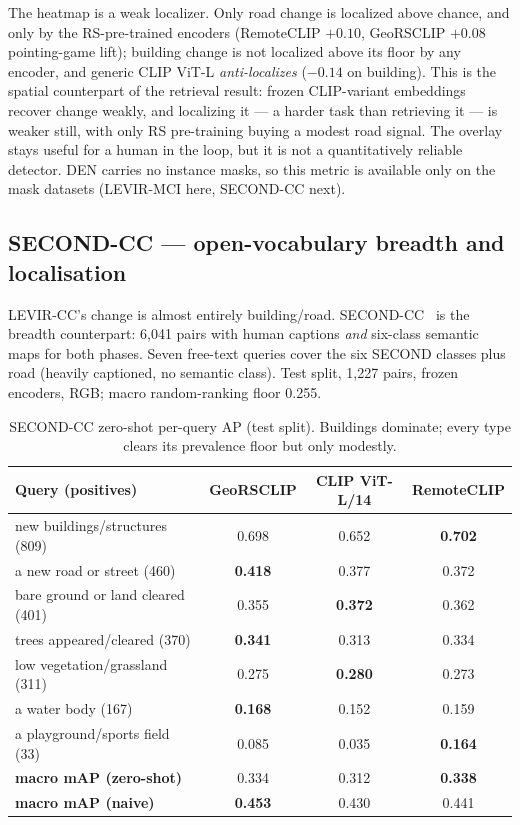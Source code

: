 \documentclass{article}
\begin{document}
The heatmap is a weak localizer. Only road change is localized above chance, and
only by the RS-pre-trained encoders (RemoteCLIP $+0.10$, GeoRSCLIP $+0.08$
pointing-game lift); building change is not localized above its floor by any
encoder, and generic CLIP ViT-L \emph{anti-localizes} ($-0.14$ on building). This
is the spatial counterpart of the retrieval result: frozen CLIP-variant embeddings
recover change weakly, and localizing it --- a harder task than retrieving it ---
is weaker still, with only RS pre-training buying a modest road signal. The overlay
stays useful for a human in the loop, but it is not a quantitatively reliable
detector. DEN carries no instance masks, so this metric is available only on the
mask datasets (LEVIR-MCI here, SECOND-CC next).

\subsection{SECOND-CC --- open-vocabulary breadth and localisation}
\label{sec:secondcc}

LEVIR-CC's change is almost entirely building/road. SECOND-CC~\cite{secondcc}
is the breadth counterpart: 6{,}041 pairs with
human captions \emph{and} six-class semantic maps for both phases. Seven free-text
queries cover the six SECOND classes plus road (heavily captioned, no semantic
class). Test split, 1{,}227 pairs, frozen encoders, RGB; macro random-ranking
floor 0.255.

\begin{table}[H]
    \centering
    \caption{SECOND-CC zero-shot per-query AP (test split). Buildings dominate;
    every type clears its prevalence floor but only modestly.}
    \label{tab:secondcc}
    \begin{tabular}{lccc}
        \toprule
        \textbf{Query (positives)} & \textbf{GeoRSCLIP} & \textbf{CLIP ViT-L/14} & \textbf{RemoteCLIP} \\
        \midrule
        new buildings/structures (809) & 0.698 & 0.652 & \textbf{0.702} \\
        a new road or street (460)     & \textbf{0.418} & 0.377 & 0.372 \\
        bare ground or land cleared (401) & 0.355 & \textbf{0.372} & 0.362 \\
        trees appeared/cleared (370)   & \textbf{0.341} & 0.313 & 0.334 \\
        low vegetation/grassland (311) & 0.275 & \textbf{0.280} & 0.273 \\
        a water body (167)             & \textbf{0.168} & 0.152 & 0.159 \\
        a playground/sports field (33) & 0.085 & 0.035 & \textbf{0.164} \\
        \midrule
        \textbf{macro mAP (zero-shot)} & 0.334 & 0.312 & \textbf{0.338} \\
        \textbf{macro mAP (naive)}     & \textbf{0.453} & 0.430 & 0.441 \\
        \bottomrule
    \end{tabular}
\end{table}
\end{document}
